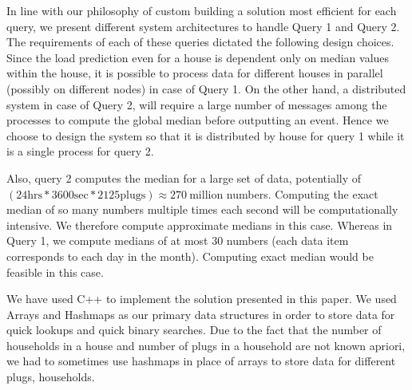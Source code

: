 In line with our philosophy of custom building a solution most efficient for each query, we present different system architectures to handle Query 1 and Query 2.
The requirements of each of these queries dictated the following design choices. Since the load prediction even for a house is dependent only on median values within the house, it is possible to process data for different houses in parallel (possibly on different nodes) in case of Query 1.
On the other hand, a distributed system in case of Query 2, will require a large number of messages among the processes to compute the global median before outputting an event. Hence we choose to design the system so that it is distributed by house for query 1 while it is a single process for query 2.

Also, query 2 computes the median for a large set of data, potentially  of $(24 \mbox{hrs} * 3600 \mbox{sec} * 2125 \mbox{plugs}) \approx 270 \ \mbox{million}$ numbers. Computing the exact median of so many numbers multiple times each second will be computationally intensive. We therefore compute approximate medians in this case. Whereas in Query 1, we compute medians of at most 30 numbers (each data item corresponds to each day in the month).
Computing exact median would be feasible in this case.

We have used C++ to implement the solution presented in this paper. We used Arrays and Hashmaps as our primary data structures in order to store data for quick lookups and quick binary searches. Due to the fact that the number of households in a house and number of plugs in a household are not known apriori, we had to sometimes use hashmaps in place of arrays to store data for different plugs, households.
